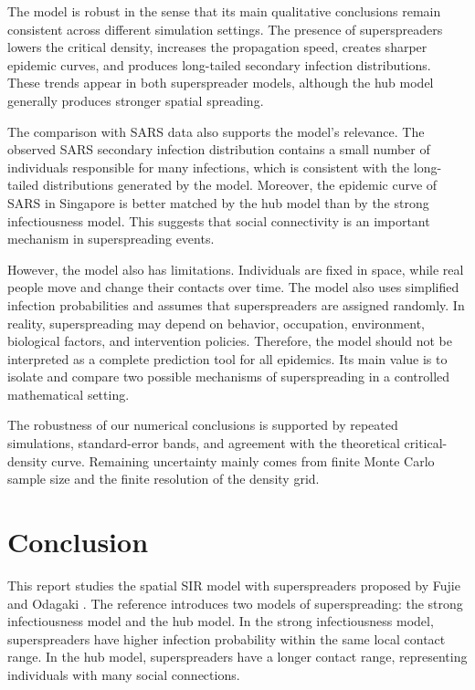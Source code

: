 \documentclass[11pt,a4paper]{article}
\begin{document}
The model is robust in the sense that its main qualitative conclusions remain consistent across different simulation settings. The presence of superspreaders lowers the critical density, increases the propagation speed, creates sharper epidemic curves, and produces long-tailed secondary infection distributions. These trends appear in both superspreader models, although the hub model generally produces stronger spatial spreading.

The comparison with SARS data also supports the model's relevance. The observed SARS secondary infection distribution contains a small number of individuals responsible for many infections, which is consistent with the long-tailed distributions generated by the model. Moreover, the epidemic curve of SARS in Singapore is better matched by the hub model than by the strong infectiousness model. This suggests that social connectivity is an important mechanism in superspreading events.

However, the model also has limitations. Individuals are fixed in space, while real people move and change their contacts over time. The model also uses simplified infection probabilities and assumes that superspreaders are assigned randomly. In reality, superspreading may depend on behavior, occupation, environment, biological factors, and intervention policies. Therefore, the model should not be interpreted as a complete prediction tool for all epidemics. Its main value is to isolate and compare two possible mechanisms of superspreading in a controlled mathematical setting.

The robustness of our numerical conclusions is supported by repeated simulations, standard-error bands, and agreement with the theoretical critical-density curve. Remaining uncertainty mainly comes from finite Monte Carlo sample size and the finite resolution of the density grid.

\section{Conclusion}

This report studies the spatial SIR model with superspreaders proposed by Fujie and Odagaki \cite{fujie2007}. The reference introduces two models of superspreading: the strong infectiousness model and the hub model. In the strong infectiousness model, superspreaders have higher infection probability within the same local contact range. In the hub model, superspreaders have a longer contact range, representing individuals with many social connections.
\end{document}
